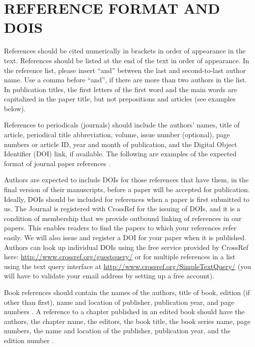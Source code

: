 \documentclass[fleqn]{jaes}
\begin{document}
\section{REFERENCE FORMAT AND DOIS}
References should be cited numerically in brackets in order of appearance in the text. References should be listed at the end of the text in order of appearance. In the reference list, please insert “and” between the last and second-to-last author name. Use a comma before “and”, if there are more than two authors in the list. In publication titles, the first letters of the first word and the main words are capitalized in the paper title, but not prepositions and articles (see examples below).

References to periodicals (journals) should include the authors’ names, title of article, periodical title abbreviation, volume, issue number (optional), page numbers or article ID, year and month of publication, and the Digital Object Identifier (DOI) link, if available. The following are examples of the expected format of journal paper references \cite{a_journal_paper, a_journal_paper_with_many_authors, a_journal_paper_with_article_ID}.

Authors are expected to include DOIs for those references that have them, in the final version of their manuscripts, before a paper will be accepted for publication. Ideally, DOIs should be included for references when a paper is first submitted to us. The Journal is registered with CrossRef for the issuing of DOIs, and it is a condition of membership that we provide outbound linking of references in our papers. This enables readers to find the papers to which your references refer easily. We will also issue and register a DOI for your paper when it is published. Authors can look up individual DOIs using the free service provided by CrossRef here: \url{http://www.crossref.org/guestquery/} or for multiple references in a list using the text query interface at \url{http://www.crossref.org/SimpleTextQuery/} (you will have to validate your email address by setting up a free account).

Book references should contain the names of the authors, title of book, edition (if other than first), name and location of publisher, publication year, and page numbers \cite{a_book_ref, a_book_ref_2nd_edition}. A reference to a chapter published in an edited book should have the authors, the chapter name, the editors, the book title, the book series name, page numbers, the name and location of the publisher, publication year, and the edition number \cite{a_book_chapter}. 
\end{document}
